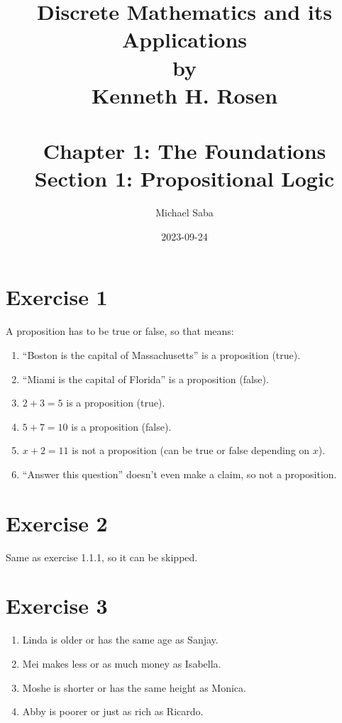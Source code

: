 \documentclass{article}
\title{%
    \Huge Discrete Mathematics and its Applications \\
    \large by \\
    \Large Kenneth H. Rosen \\~\\
    \huge Chapter 1: The Foundations \\
    \LARGE Section 1: Propositional Logic \\
}
\date{2023-09-24}
\author{Michael Saba}
\begin{document}
    \maketitle
    \newpage


    \section*{Exercise 1}
    A proposition has to be true or false,
    so that means:
    \begin{enumerate}[label=\textbf{\alph*.}]
        \item
            \enquote{Boston is the capital of Massachusetts} 
            is a proposition (true).
        \item
            \enquote{Miami is the capital of Florida} 
            is a proposition (false).
        \item 
            $2 + 3 = 5$ is a proposition (true).
        \item 
            $5 + 7 = 10$ is a proposition (false).
        \item 
            $x + 2 = 11$ is not a proposition 
            (can be true or false depending on $x$).
        \item
            \enquote{Answer this question} 
            doesn't even make a claim,
            so not a proposition.
    \end{enumerate}


    \section*{Exercise 2}
    Same as exercise 1.1.1, so it can be skipped.


    \section*{Exercise 3}
    \begin{enumerate}[label=\textbf{\alph*.}]
        \item
            Linda is older or has the same age as Sanjay.
        \item
            Mei makes less or as much money as Isabella. 
        \item 
            Moshe is shorter or has the same height as Monica.
        \item 
            Abby is poorer or just as rich as Ricardo.
    \end{enumerate}
\end{document}
